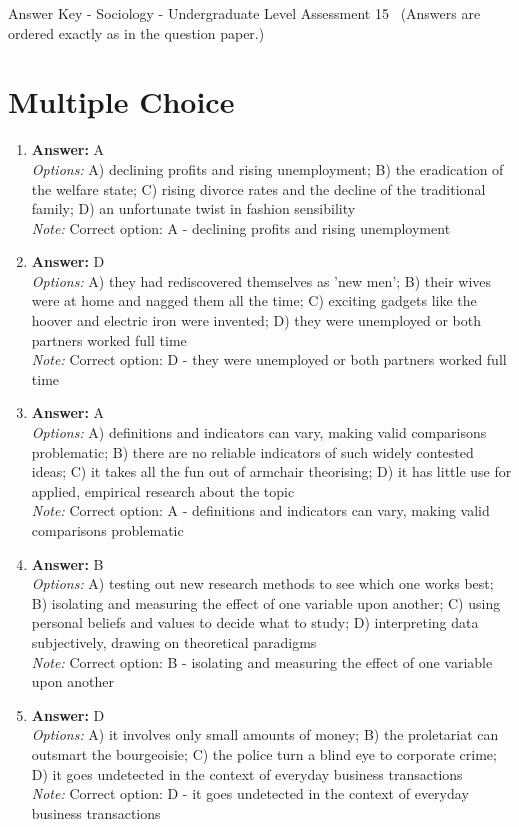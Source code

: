\documentclass[12pt]{article}
\begin{document}
\begin{center}
Answer Key - Sociology - Undergraduate Level Assessment 15 \
\small (Answers are ordered exactly as in the question paper.)
\end{center}

\section*{Multiple Choice}
\begin{enumerate}[label=\arabic*.]
\item \textbf{Answer:} A
\\ \textit{Options:} A) declining profits and rising unemployment; B) the eradication of the welfare state; C) rising divorce rates and the decline of the traditional family; D) an unfortunate twist in fashion sensibility
\\ \textit{Note:} Correct option: A - declining profits and rising unemployment
\item \textbf{Answer:} D
\\ \textit{Options:} A) they had rediscovered themselves as 'new men'; B) their wives were at home and nagged them all the time; C) exciting gadgets like the hoover and electric iron were invented; D) they were unemployed or both partners worked full time
\\ \textit{Note:} Correct option: D - they were unemployed or both partners worked full time
\item \textbf{Answer:} A
\\ \textit{Options:} A) definitions and indicators can vary, making valid comparisons problematic; B) there are no reliable indicators of such widely contested ideas; C) it takes all the fun out of armchair theorising; D) it has little use for applied, empirical research about the topic
\\ \textit{Note:} Correct option: A - definitions and indicators can vary, making valid comparisons problematic
\item \textbf{Answer:} B
\\ \textit{Options:} A) testing out new research methods to see which one works best; B) isolating and measuring the effect of one variable upon another; C) using personal beliefs and values to decide what to study; D) interpreting data subjectively, drawing on theoretical paradigms
\\ \textit{Note:} Correct option: B - isolating and measuring the effect of one variable upon another
\item \textbf{Answer:} D
\\ \textit{Options:} A) it involves only small amounts of money; B) the proletariat can outsmart the bourgeoisie; C) the police turn a blind eye to corporate crime; D) it goes undetected in the context of everyday business transactions
\\ \textit{Note:} Correct option: D - it goes undetected in the context of everyday business transactions
\end{enumerate}
\end{document}
